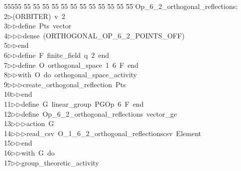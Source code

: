 %
%
\begin{tabbing}
55555 \= 55 \= 55 \= 55 \= 55 \= 55 \= 55 \= 55 \= 55 \= 55 \= 55 \= 55 \= 55 \= \>Op\_6\_2\_orthogonal\_reflections:\\[0pt]
2\>$\triangleright$\>(ORBITER)\ v\ 2\ \\[0pt]
3\>$\triangleright$\>$\triangleright$\>define\ Pts\ vector\ \\[0pt]
4\>$\triangleright$\>$\triangleright$\>$\triangleright$\>dense\ (ORTHOGONAL\_OP\_6\_2\_POINTS\_OFF)\ \\[0pt]
5\>$\triangleright$\>$\triangleright$\>end\ \\[0pt]
6\>$\triangleright$\>$\triangleright$\>define\ F\ finite\_field\ q\ 2\ end\ \\[0pt]
7\>$\triangleright$\>$\triangleright$\>define\ O\ orthogonal\_space\ 1\ 6\ F\ end\ \\[0pt]
8\>$\triangleright$\>$\triangleright$\>with\ O\ do\ orthogonal\_space\_activity\ \\[0pt]
9\>$\triangleright$\>$\triangleright$\>$\triangleright$\>create\_orthogonal\_reflection\ Pts\ \\[0pt]
10\>$\triangleright$\>$\triangleright$\>end\ \\[0pt]
11\>$\triangleright$\>$\triangleright$\>define\ G\ linear\_group\ PGOp\ 6\ F\ end\ \\[0pt]
12\>$\triangleright$\>$\triangleright$\>define\ Op\_6\_2\_orthogonal\_reflections\ vector\_ge\ \\[0pt]
13\>$\triangleright$\>$\triangleright$\>$\triangleright$\>action\ G\ \\[0pt]
14\>$\triangleright$\>$\triangleright$\>$\triangleright$\>read\_csv\ O\_1\_6\_2\_orthogonal\_reflectionscsv\ Element\ \\[0pt]
15\>$\triangleright$\>$\triangleright$\>end\ \\[0pt]
16\>$\triangleright$\>$\triangleright$\>with\ G\ do\ \\[0pt]
17\>$\triangleright$\>$\triangleright$\>group\_theoretic\_activity\ \\[0pt]

\end{tabbing}
